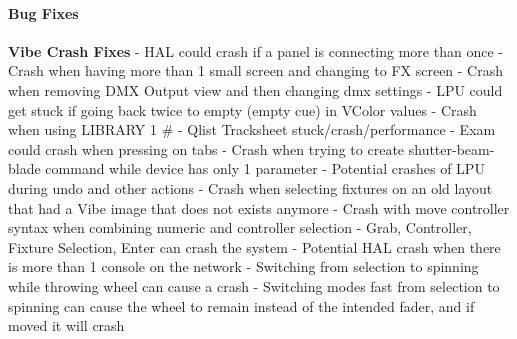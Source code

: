 \documentclass[
]{article}
\begin{document}
\hypertarget{bug-fixes}{%
\paragraph{Bug Fixes}\label{bug-fixes}}

\textbf{Vibe Crash Fixes}
- HAL could crash if a panel is connecting more than once
- Crash when having more than 1 small screen and changing to FX screen
- Crash when removing DMX Output view and then changing dmx settings
- LPU could get stuck if going back twice to empty (empty cue) in VColor values
- Crash when using LIBRARY 1 \#
- Qlist Tracksheet stuck/crash/performance
- Exam could crash when pressing on tabs
- Crash when trying to create shutter-beam-blade command while device has only 1 parameter
- Potential crashes of LPU during undo and other actions
- Crash when selecting fixtures on an old layout that had a Vibe image that does not exists anymore
- Crash with move controller syntax when combining numeric and controller selection
- Grab, Controller, Fixture Selection, Enter can crash the system
- Potential HAL crash when there is more than 1 console on the network
- Switching from selection to spinning while throwing wheel can cause a crash
- Switching modes fast from selection to spinning can cause the wheel to remain instead of the intended fader, and if moved it will crash
\end{document}
